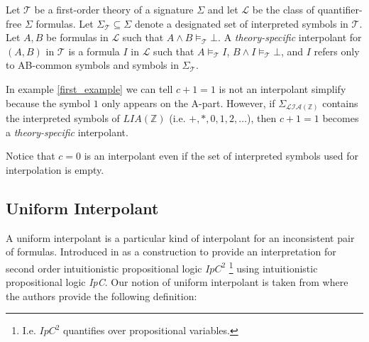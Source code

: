 \begin{definition} \cite{10.1007/11532231_26}
  Let $\mathcal{T}$ be a first-order theory of a signature $\Sigma$ and 
  let $\mathcal{L}$ be the class of quantifier-free $\Sigma$ formulas.
  Let $\Sigma_\mathcal{T} \subseteq \Sigma$ denote a designated set
  of interpreted symbols in $\mathcal{T}$. Let $A, B$ be formulas
  in $\mathcal{L}$ such that $A \land B \models_{\mathcal{T}} \bot$.
  A \emph{theory-specific} interpolant for $(A, B)$ in $\mathcal{T}$
  is a formula $I$ in $\mathcal{L}$ such that 
  $A \models_{\mathcal{T}} I$, $B \land I \models_{\mathcal{T}} \bot$,
  and $I$ refers only to AB-common symbols and symbols in 
  $\Sigma_{\mathcal{T}}$.
\end{definition}

\begin{example}
  In example \ref{first_example} we can tell $c + 1 = 1$ is not an
  interpolant simplify because the symbol $1$ only appears on the
  A-part. However, if $\Sigma_{\mathcal{LIA(\mathbb{Z})}}$ contains the
  interpreted symbols of $LIA(\mathbb{Z})$ (i.e. $+, *, 0, 1, 2, \dots$),
  then $c + 1 = 1$ becomes a \emph{theory-specific} interpolant. 

  Notice that $c = 0$ is an interpolant even if the set of interpreted symbols 
  used for interpolation is empty.
\end{example}

\subsection{Uniform Interpolant}

A uniform interpolant is a particular kind of interpolant for an inconsistent
pair of formulas. Introduced in \cite{pitts1992} as a 
construction to provide an interpretation
for second order intuitionistic propositional logic 
\emph{$IpC^2$}
\footnote{I.e. $IpC^2$ quantifies over 
propositional variables.}
using intuitionistic propositional logic \emph{IpC}.
Our notion of uniform interpolant is taken 
from \cite{ghilardi2020compactly}
where the authors provide the following definition:

